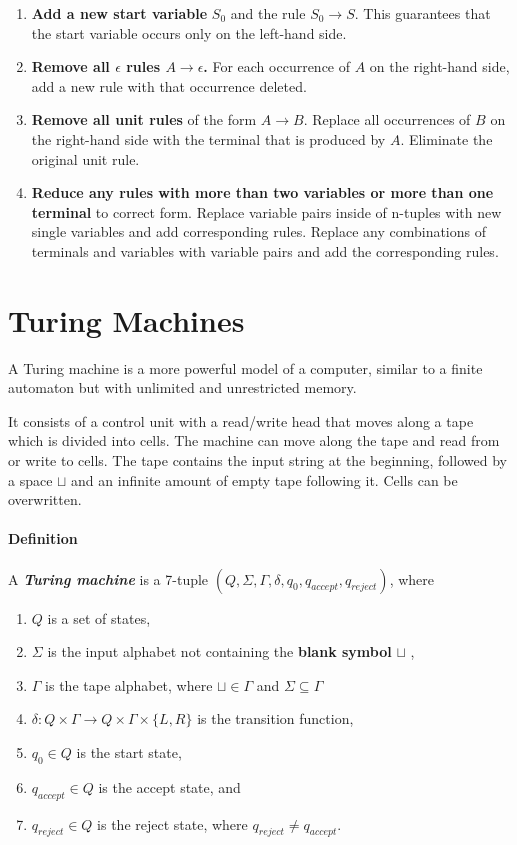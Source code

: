 \begin{enumerate}
	\item \textbf{Add a new start variable}  \( S_0 \) and the rule \( S_0 \rightarrow S \). This guarantees that the start variable occurs only on the left-hand side.
	\item \textbf{Remove all \( \epsilon \) rules \( A \rightarrow \epsilon \).}  For each occurrence of \( A \) on the right-hand side, add a new rule with that occurrence deleted.
	\item \textbf{Remove all unit rules}  of the form \( A \rightarrow B \). Replace all occurrences of \( B \) on the right-hand side with the terminal that is produced by \( A \). Eliminate the original unit rule.
	\item \textbf{Reduce any rules with more than two variables or more than one terminal}  to correct form. Replace variable pairs inside of n-tuples with new single variables and add corresponding rules. Replace any combinations of terminals and variables with variable pairs and add the corresponding rules.
\end{enumerate}




\section{Turing Machines}

A Turing machine is a more powerful model of a computer, similar to a finite automaton but with unlimited and unrestricted memory.

It consists of a control unit with a read/write head that moves along a tape which is divided into cells. The machine can move along the tape and read from or write to cells. The tape contains the input string at the beginning, followed by a space \( \sqcup \)  and an infinite amount of empty tape following it. Cells can be overwritten.

\paragraph{Definition} A \textbf{\emph{Turing machine} } is a 7-tuple \( (Q, \Sigma, \Gamma, \delta, q_0, q_{accept}, q_{reject}) \), where

\begin{enumerate}
	\item \( Q \) is a set of states,
	\item \( \Sigma \) is the input alphabet not containing the \textbf{blank symbol} \( \sqcup \) , 
	\item \( \Gamma  \) is the tape alphabet, where  \( \sqcup \in \Gamma \) and \( \Sigma \subseteq \Gamma \) 
	\item \( \delta: Q \times \Gamma \rightarrow Q \times \Gamma \times \{L, R\} \) is the transition function,
	\item \( q_0 \in Q \) is the start state,
	\item \( q_{accept} \in Q \) is the accept state, and
	\item \( q_{reject} \in Q\) is the reject state, where \( q_{reject} \neq q_{accept} \).     
\end{enumerate}

